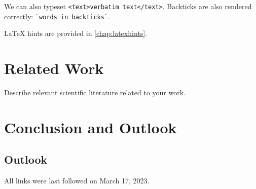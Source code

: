 \documentclass[
  a4paper,  %
  twoside,  %
  bibliography=totoc,
  headsepline,
  cleardoublepage=empty,
  parskip=half,
  draft=false
]{scrbook}
\begin{document}
We can also typeset \verb|<text>verbatim text</text>|.
Backticks are also rendered correctly: \verb|`words in backticks`|.

LaTeX hints are provided in \cref{chap:latexhints}.

\chapter{Related Work}
Describe relevant scientific literature related to your work.

\chapter{Conclusion and Outlook}
\label{chap:outlook}

\section*{Outlook}

\printbibliography

All links were last followed on March 17, 2023.

\appendix


\pagestyle{empty}
\renewcommand*{\chapterpagestyle}{empty}
\Versicherung
\end{document}
